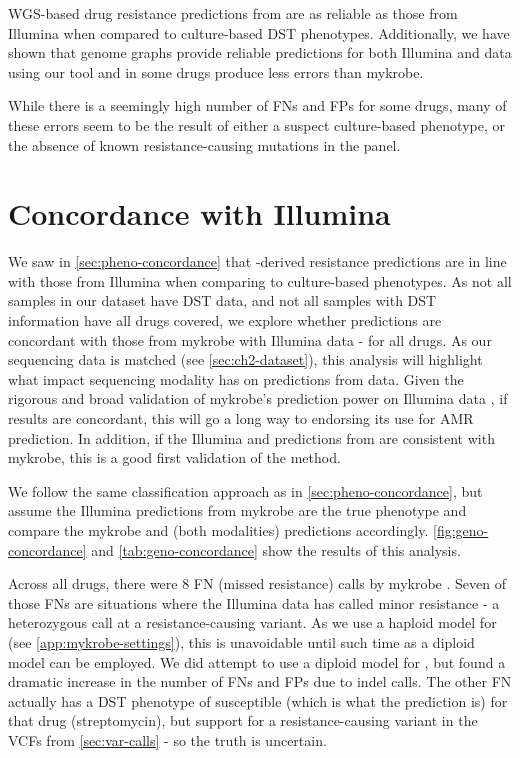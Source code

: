 WGS-based drug resistance predictions from \ont{} are as reliable as those from Illumina when compared to culture-based DST phenotypes. Additionally, we have shown that genome graphs provide reliable predictions for both Illumina and \ont{} data using our tool \drprg{} and in some drugs produce less errors than mykrobe.

While there is a seemingly high number of FNs and FPs for some drugs, many of these errors seem to be the result of either a suspect culture-based phenotype, or the absence of known resistance-causing mutations in the panel.

\section{Concordance with Illumina}
\label{sec:geno-concordance}

We saw in \autoref{sec:pheno-concordance} that \ont{}-derived resistance predictions are in line with those from Illumina when comparing to culture-based phenotypes. As not all samples in our dataset have DST data, and not all samples with DST information have all drugs covered, we explore whether \ont{} predictions are concordant with those from mykrobe with Illumina data - for all drugs. As our sequencing data is matched (see \autoref{sec:ch2-dataset}), this analysis will highlight what impact sequencing modality has on predictions from \ont{} data. Given the rigorous and broad validation of mykrobe's prediction power on Illumina data \cite{hunt2019}, if \ont{} results are concordant, this will go a long way to endorsing its use for AMR prediction. In addition, if the Illumina and \ont{} predictions from \drprg{} are consistent with mykrobe, this is a good first validation of the method.

We follow the same classification approach as in \autoref{sec:pheno-concordance}, but assume the Illumina predictions from mykrobe are the true phenotype and compare the mykrobe \ont{} and \drprg{} (both modalities) predictions accordingly. \autoref{fig:geno-concordance} and \autoref{tab:geno-concordance} show the results of this analysis.

Across all drugs, there were 8 FN (missed resistance) calls by mykrobe \ont{}. Seven of those FNs are situations where the Illumina data has called minor resistance - a heterozygous call at a resistance-causing variant. As we use a haploid model for \ont{} (see \autoref{app:mykrobe-settings}), this is unavoidable until such time as a diploid model can be employed. We did attempt to use a diploid model for \ont{}, but found a dramatic increase in the number of FNs and FPs due to indel calls. The other FN actually has a DST phenotype of susceptible (which is what the \ont{} prediction is) for that drug (streptomycin), but support for a resistance-causing variant in the VCFs from \autoref{sec:var-calls} - so the truth is uncertain.

